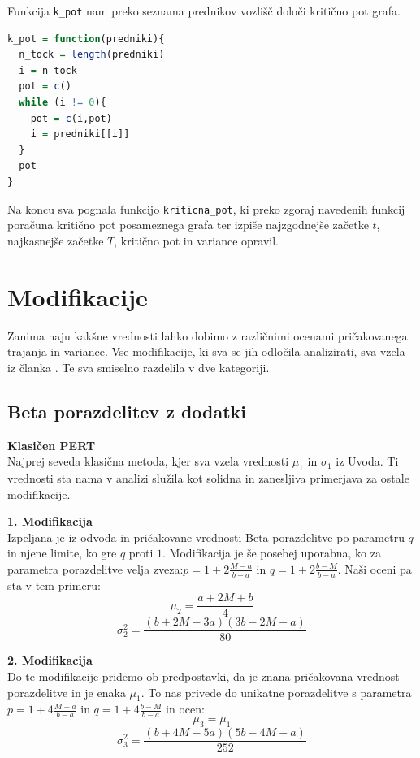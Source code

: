 \documentclass[12pt, a4paper]{article}
\begin{document}
Funkcija \texttt{k\_pot} nam preko seznama prednikov vozlišč določi kritično pot grafa.
\begin{lstlisting}[language=R]
k_pot = function(predniki){
  n_tock = length(predniki)
  i = n_tock
  pot = c()
  while (i != 0){
    pot = c(i,pot)
    i = predniki[[i]]
  }
  pot
}
\end{lstlisting}

Na koncu sva pognala funkcijo \texttt{kriticna\_pot}, ki preko zgoraj navedenih funkcij poračuna kritično pot posameznega grafa ter izpiše najzgodnejše začetke $t$, najkasnejše začetke $T$, kritično pot in variance opravil.

\section{Modifikacije}
Zanima naju kakšne vrednosti lahko dobimo z različnimi ocenami pričakovanega trajanja in variance.
Vse modifikacije, ki sva se jih odločila analizirati, sva vzela iz članka \cite{clanek}. Te sva smiselno razdelila v dve kategoriji.

\subsection{Beta porazdelitev z dodatki}
\textbf{Klasičen PERT}\\
Najprej seveda klasična metoda, kjer sva vzela vrednosti $\mu_1$ in $\sigma_1$ iz Uvoda. Ti vrednosti
sta nama v analizi služila kot solidna in zanesljiva primerjava za ostale modifikacije.

\vspace{0,5cm}
\textbf{1. Modifikacija}\\
Izpeljana je iz odvoda in pričakovane vrednosti Beta porazdelitve po parametru $q$ in njene limite, ko gre $q$ proti $1$. Modifikacija je še posebej uporabna, ko za parametra porazdelitve velja zveza:$p = 1 + 2\frac{M - a}{b - a}$ in $q = 1 + 2\frac{b - M}{b - a}$. Naši oceni pa sta v tem primeru:
$$\mu_2 = \frac{a + 2M + b}{4}$$
$$\sigma_2^2 = \frac{(b + 2M - 3a)(3b - 2M - a)}{80}$$

\vspace{0,5cm}
\textbf{2. Modifikacija}\\
Do te modifikacije pridemo ob predpostavki, da je znana pričakovana vrednost porazdelitve in je enaka $\mu_1$. To nas privede do unikatne porazdelitve s parametra $p = 1 + 4\frac{M - a}{b - a}$ in $q = 1 + 4\frac{b - M}{b - a}$ in ocen:
$$\mu_3 = \mu_1$$
$$\sigma_3^2 = \frac{(b + 4M - 5a)(5b - 4M - a)}{252}$$
\end{document}
